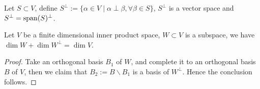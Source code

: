 Let $S \subset V$, define $S^\perp := \{\alpha\in V\mid \alpha\perp\beta,
\forall\beta\in S\}$, $S^\perp$ is a vector space and
$S^\perp = \operatorname{span} (S)^\perp$.

 \begin{proposition}
	Let $V$ be a finite dimensional inner product space, $W \subset V$ is a subspace,
	we have $\dim W + \dim W^\perp = \dim V$.
\end{proposition}
\begin{proof}[Proof]
    Take an orthogonal basis $B_1$ of $W$,
	and complete it to an orthogonal basis $B$ of $V$,
	then we claim that $B_2 := B \backslash B_1$ is a basis of $W^\perp$.
	Hence the conclusion follows.
\end{proof}
